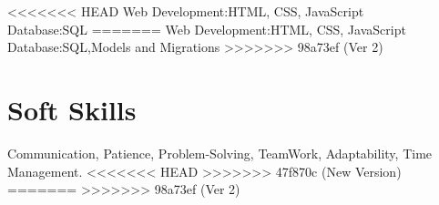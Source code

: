 \documentclass[]{resume-openfont}
\newcommand{\resumeHeading}[4]{\runsubsection{\uppercase{#1}}\descript{ | #2}\hfill\location{#3 | #4}\fakeNewLine}
\begin{document}
\begin{skillList}
<<<<<<< HEAD
    {Web Development:}{HTML, CSS, JavaScript}
    \\
    {Database:}{SQL}
=======
    {Web Development:}{HTML, CSS, JavaScript}
    \\
    {Database:}{SQL,Models and Migrations}
>>>>>>> 98a73ef (Ver 2)
    \\
\end{skillList}
\sectionsep

\section{Soft Skills}
Communication, Patience, Problem-Solving, TeamWork, Adaptability, Time Management.
\sectionsep
<<<<<<< HEAD
>>>>>>> 47f870c (New Version)
=======
>>>>>>> 98a73ef (Ver 2)
\end{document}
